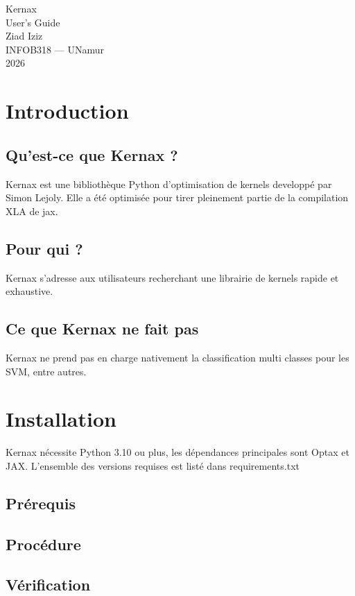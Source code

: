 \documentclass[12pt,a4paper]{report}
\begin{document}
\begin{titlepage}
    \centering
    \vspace*{4cm}
    {\Huge Kernax}\\[0.5cm]
    {\large User's Guide}\\[2cm]
    {\large Ziad Iziz}\\[0.5cm]
    {\large INFOB318 --- UNamur}\\[0.5cm]
    {\large 2026}
\end{titlepage}

\tableofcontents
\newpage

\chapter{Introduction}
\section{Qu'est-ce que Kernax ?}
Kernax est une bibliothèque Python d'optimisation de kernels developpé par Simon Lejoly.
Elle a été optimisée pour tirer pleinement partie de la compilation XLA de jax.
\section{Pour qui ?}
Kernax s'adresse aux utilisateurs recherchant une librairie de kernels rapide et exhaustive.
\section{Ce que Kernax ne fait pas}
Kernax ne prend pas en charge nativement la classification multi classes pour les SVM, entre autres.

\chapter{Installation}
Kernax nécessite Python 3.10 ou plus, les dépendances principales sont Optax et JAX.
L'ensemble des versions requises est listé dans requirements.txt
\section{Prérequis}
\section{Procédure}
\section{Vérification}
\end{document}
